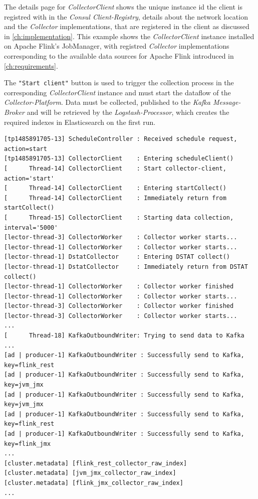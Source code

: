 The details page for \textit{CollectorClient} shows the unique instance id the client is registred with in the \textit{Consul Client-Registry},
details about the network location and the \textit{Collector} implementations, that are registered in the client as discussed in
\autoref{ch:implementation}. This example shows the \textit{CollectorClient} instance installed on Apache Flink's JobManager,
with registred \textit{Collector} implementations corresponding to the available data sources for Apache Flink introduced in
\autoref{ch:requirements}.

The \verb|"Start client"| button is used to trigger the collection process in the corresponding \textit{CollectorClient} instance and
must start the dataflow of the \textit{Collector-Platform}. Data must be collected, published to the \textit{Kafka Message-Broker} and will
be retrieved by the \textit{Logstash-Processor}, which creates the required indexes in Elasticsearch on the first run.
\begin{verbatim}
[tp1485891705-13] ScheduleController : Received schedule request, action=start
[tp1485891705-13] CollectorClient    : Entering scheduleClient()
[      Thread-14] CollectorClient    : Start collector-client, action='start'
[      Thread-14] CollectorClient    : Entering startCollect()
[      Thread-14] CollectorClient    : Immediately return from startCollect()
[      Thread-15] CollectorClient    : Starting data collection, interval='5000'
[lector-thread-3] CollectorWorker    : Collector worker starts...
[lector-thread-1] CollectorWorker    : Collector worker starts...
[lector-thread-1] DstatCollector     : Entering DSTAT collect()
[lector-thread-1] DstatCollector     : Immediately return from DSTAT collect()
[lector-thread-1] CollectorWorker    : Collector worker finished
[lector-thread-1] CollectorWorker    : Collector worker starts...
[lector-thread-3] CollectorWorker    : Collector worker finished
[lector-thread-3] CollectorWorker    : Collector worker starts...
...
[      Thread-18] KafkaOutboundWriter: Trying to send data to Kafka
...
[ad | producer-1] KafkaOutboundWriter : Successfully send to Kafka, key=flink_rest
[ad | producer-1] KafkaOutboundWriter : Successfully send to Kafka, key=jvm_jmx
[ad | producer-1] KafkaOutboundWriter : Successfully send to Kafka, key=jvm_jmx
[ad | producer-1] KafkaOutboundWriter : Successfully send to Kafka, key=flink_rest
[ad | producer-1] KafkaOutboundWriter : Successfully send to Kafka, key=flink_jmx
...
[cluster.metadata] [flink_rest_collector_raw_index]
[cluster.metadata] [jvm_jmx_collector_raw_index]
[cluster.metadata] [flink_jmx_collector_raw_index]
...
\end{verbatim}

